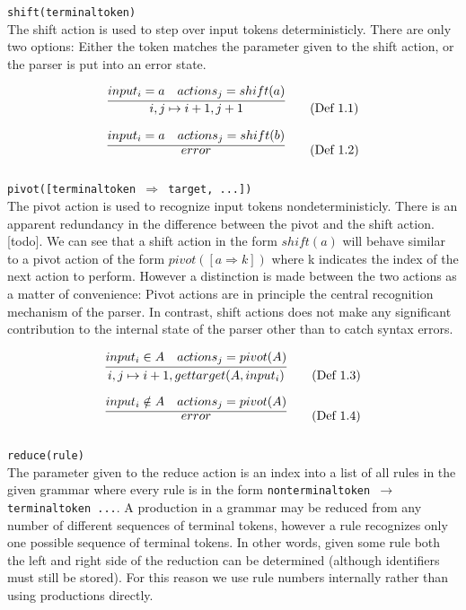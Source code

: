 \documentclass[11pt]{article}
\begin{document}
\texttt{shift(terminaltoken)}\\
The shift action is used to step over input tokens deterministicly. 
There are only two options: Either the token matches the parameter given to the shift action, or the parser is put into an error state.

\begin{equation}
\infer{i, j \mapsto i+1, j+1}{input_i = a & actions_j = shift(a)} \tag{Def 1.1}
\end{equation}

\begin{equation}
\infer{error}{input_i = a & actions_j = shift(b)} \tag{Def 1.2}
\end{equation}\\

\texttt{pivot([terminaltoken $\Rightarrow$ target, ...])}\\
The pivot action is used to recognize input tokens nondeterministicly. 
There is an apparent redundancy in the difference between the pivot and the shift action. [todo]. 
We can see that a shift action in the form $shift(a)$ will behave similar to a pivot action of the form $pivot([a \Rightarrow k])$ where k indicates the index of the next action to perform.
However a distinction is made between the two actions as a matter of convenience:
Pivot actions are in principle the central recognition mechanism of the parser. 
In contrast, shift actions does not make any significant contribution to the internal state of the parser other than to catch syntax errors.

\begin{equation}
\infer{i, j \mapsto i+1, gettarget(A, input_i)}{input_i \in A & actions_j = pivot(A)} \tag{Def 1.3}
\end{equation}

\begin{equation}
\infer{error}{input_i \notin A & actions_j = pivot(A)} \tag{Def 1.4}
\end{equation}\\

\texttt{reduce(rule)}\\
The parameter given to the reduce action is an index into a list of all rules in the given grammar where every rule is in the form \texttt{nonterminaltoken $\rightarrow$ terminaltoken ...}. 
A production in a grammar may be reduced from any number of different sequences of terminal tokens, however a rule recognizes only one possible sequence of terminal tokens.
In other words, given some rule both the left and right side of the reduction can be determined (although identifiers must still be stored).
For this reason we use rule numbers internally rather than using productions directly.
\end{document}
